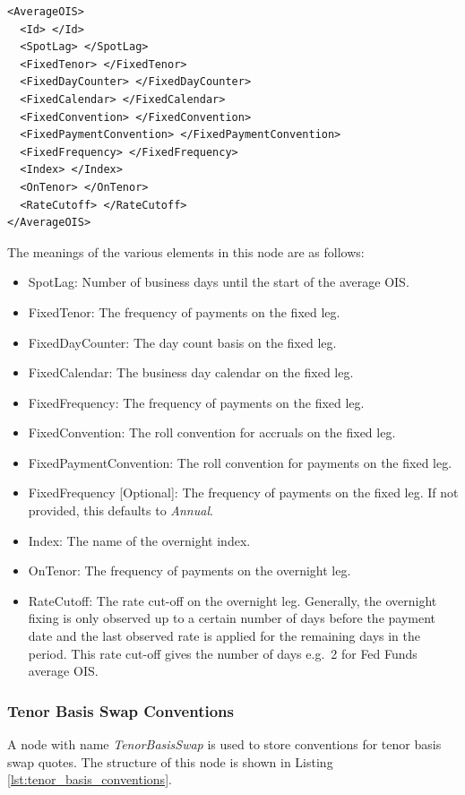 \begin{listing}[H]
\begin{verbatim}
<AverageOIS>
  <Id> </Id>
  <SpotLag> </SpotLag>
  <FixedTenor> </FixedTenor>
  <FixedDayCounter> </FixedDayCounter>
  <FixedCalendar> </FixedCalendar>
  <FixedConvention> </FixedConvention>
  <FixedPaymentConvention> </FixedPaymentConvention>
  <FixedFrequency> </FixedFrequency>
  <Index> </Index>
  <OnTenor> </OnTenor>
  <RateCutoff> </RateCutoff>
</AverageOIS>
\end{verbatim}
\caption{Average OIS conventions}
\label{lst:average_ois_conventions}
\end{listing}


The meanings of the various elements in this node are as follows:
\begin{itemize}
\item SpotLag: Number of business days until the start of the average OIS.
\item FixedTenor: The frequency of payments on the fixed leg.
\item FixedDayCounter: The day count basis on the fixed leg.
\item FixedCalendar: The business day calendar on the fixed leg.
\item FixedFrequency: The frequency of payments on the fixed leg.
\item FixedConvention: The roll convention for accruals on the fixed leg.
\item FixedPaymentConvention: The roll convention for payments on the fixed leg.
\item FixedFrequency [Optional]: The frequency of payments on the fixed leg. If not provided, this defaults to \emph{Annual}.
\item Index: The name of the overnight index.
\item OnTenor: The frequency of payments on the overnight leg.
\item RateCutoff: The rate cut-off on the overnight leg. Generally, the overnight fixing is only observed up to a
certain number of days before the payment date and the last observed rate is applied for the remaining days in the
period. This rate cut-off gives the number of days e.g.\ 2 for Fed Funds average OIS.
\end{itemize}

\subsubsection{Tenor Basis Swap Conventions}
A node with name \emph{TenorBasisSwap} is used to store conventions for tenor basis swap quotes. The structure of this
node is shown in Listing \ref{lst:tenor_basis_conventions}.

